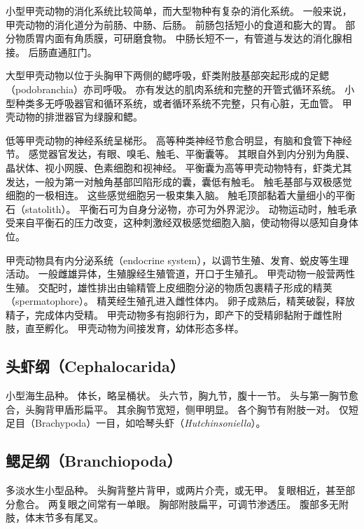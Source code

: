 \documentclass[11pt]{article}
\begin{document}
\newline

小型甲壳动物的消化系统比较简单，而大型物种有复杂的消化系统。
一般来说，甲壳动物的消化道分为前肠、中肠、后肠。
前肠包括短小的食道和膨大的胃。
部分物质胃内面有角质膜，可研磨食物。
中肠长短不一，有管道与发达的消化腺相接。
后肠直通肛门。

\newline

大型甲壳动物以位于头胸甲下两侧的鳃呼吸，虾类附肢基部突起形成的足鳃（podobranchia）亦司呼吸。
亦有发达的肌肉系统和完整的开管式循环系统。
小型种类多无呼吸器官和循环系统，或者循环系统不完整，只有心脏，无血管。
甲壳动物的排泄器官为绿腺和鳃。

\newline

低等甲壳动物的神经系统呈梯形。
高等种类神经节愈合明显，有脑和食管下神经节。
感觉器官发达，有眼、嗅毛、触毛、平衡囊等。
其眼自外到内分别为角膜、晶状体、视小网膜、色素细胞和视神经。
平衡囊为高等甲壳动物特有，虾类尤其发达，一般为第一对触角基部凹陷形成的囊，囊低有触毛。
触毛基部与双极感觉细胞的一极相连。
这些感觉细胞另一极束集入脑。
触毛顶部黏着大量细小的平衡石（statolith）。
平衡石可为自身分泌物，亦可为外界泥沙。
动物运动时，触毛承受来自平衡石的压力改变，这种刺激经双极感觉细胞入脑，使动物得以感知自身体位。

\newline

甲壳动物具有内分泌系统（endocrine system），以调节生殖、发育、蜕皮等生理活动。
一般雌雄异体，生殖腺经生殖管道，开口于生殖孔。
甲壳动物一般营两性生殖。
交配时，雄性排出由输精管上皮细胞分泌的物质包裹精子形成的精荚（spermatophore）。
精荚经生殖孔进入雌性体内。
卵子成熟后，精荚破裂，释放精子，完成体内受精。
甲壳动物多有抱卵行为，即产下的受精卵黏附于雌性附肢，直至孵化。
甲壳动物为间接发育，幼体形态多样。

\subsection{头虾纲（Cephalocarida）}
小型海生品种。
体长，略呈桶状。
头六节，胸九节，腹十一节。
头与第一胸节愈合，头胸背甲盾形扁平。
其余胸节宽短，侧甲明显。
各个胸节有附肢一对。
仅短足目（Brachypoda）一目，如哈琴头虾（\textit{Hutchinsoniella}）。

\subsection{鳃足纲（Branchiopoda）}
多淡水生小型品种。
头胸背整片背甲，或两片介壳，或无甲。
复眼相近，甚至部分愈合。
两复眼之间常有一单眼。
胸部附肢扁平，可调节渗透压。
腹部多无附肢，体末节多有尾叉。
\end{document}
